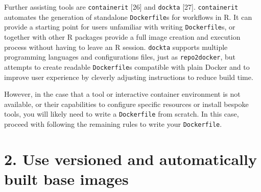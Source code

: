 \documentclass[10pt,letterpaper]{article}
\begin{document}
Further assisting tools are \texttt{containerit} {[}26{]} and
\texttt{dockta} {[}27{]}. \texttt{containerit} automates the generation
of standalone \texttt{Dockerfile}s for workflows in R. It can provide a
starting point for users unfamiliar with writing \texttt{Dockerfile}s,
or together with other R packages provide a full image creation and
execution process without having to leave an R session. \texttt{dockta}
supports multiple programming languages and configurations files, just
as \texttt{repo2docker}, but attempts to create readable
\texttt{Dockerfile}s compatible with plain Docker and to improve user
experience by cleverly adjusting instructions to reduce build time.

However, in the case that a tool or interactive container environment is
not available, or their capabilities to configure specific resources or
install bespoke tools, you will likely need to write a
\texttt{Dockerfile} from scratch. In this case, proceed with following
the remaining rules to write your \texttt{Dockerfile}.

\hypertarget{use-versioned-and-automatically-built-base-images}{%
\section*{2. Use versioned and automatically built base
images}\label{use-versioned-and-automatically-built-base-images}}
\end{document}
